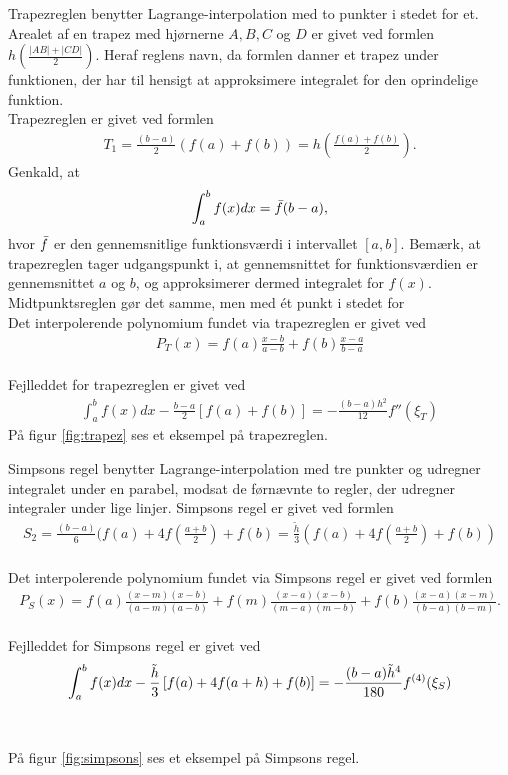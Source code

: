 Trapezreglen benytter Lagrange-interpolation med to punkter i stedet for et. 
Arealet af en trapez med hjørnerne $A, B, C$ og $D$ er givet ved formlen $h(\frac{|AB| + |CD|}{2})$. 
Heraf reglens navn, da formlen danner et trapez under funktionen, der har til hensigt at approksimere integralet for den oprindelige funktion. \\
Trapezreglen er givet ved formlen 
\begin{align*}
T_1 = \frac{(b-a)}{2}(f(a)+f(b))=h (\frac{f(a)+f(b)}{2}).
\end{align*}
Genkald, at 
\begin{align}
    \int_{a}^{b} f(x) dx = \Bar{f}(b-a),
\end{align}
hvor $\Bar{f}$ er den gennemsnitlige funktionsværdi i intervallet $[a,b]$.
Bemærk, at trapezreglen tager udgangspunkt i, at gennemsnittet for funktionsværdien er gennemsnittet $a$ og $b$, og approksimerer dermed integralet for $f(x)$. 
Midtpunktsreglen gør det samme, men med ét punkt i stedet for 
\\
Det interpolerende polynomium fundet via trapezreglen er givet ved
\begin{align*}
P_{T}(x)=f(a)\frac{x-b}{a-b}+f(b)\frac{x-a}{b-a}       
\end{align*}
\\
Fejlleddet for trapezreglen er givet ved 
\begin{align*}
\int_{a}^{b}f(x)dx-\frac{b-a}{2}\left [ f(a)+f(b) \right ]=-\frac{(b-a)h^2}{12}{f}''(\xi_T)
\end{align*}
På figur \ref{fig:trapez} ses et eksempel på trapezreglen. 


Simpsons regel benytter Lagrange-interpolation med tre punkter og udregner integralet under en parabel, modsat de førnævnte to regler, der udregner integraler under lige linjer. 
Simpsons regel er givet ved formlen 
\begin{align*}
S_2 = \frac{(b-a)}{6}(f(a)+4f(\frac{a+b}{2})+f(b)=\frac{\widetilde{h}}{3}(f(a)+4f(\frac{a+b}{2})+f(b))
\end{align*}
\\
Det interpolerende polynomium fundet via Simpsons regel er givet ved formlen
\begin{align*}
P_{S}(x)=f(a)\frac{(x-m)(x-b)}{(a-m)(a-b)}+f(m)\frac{(x-a)(x-b)}{(m-a)(m-b)}+f(b)\frac{(x-a)(x-m)}{(b-a)(b-m)}.
\end{align*}
\\
Fejlleddet for Simpsons regel er givet ved 
\begin{align*}
\int_{a}^{b}f(x)dx-\frac{\Tilde{h}}{3}\left [ f(a)+4f(a+h) + f(b) \right ]=-\frac{(b-a)\Tilde{h}^4}{180}{f}^{(4)}(\xi_S)
\end{align*} \\\\
På figur \ref{fig:simpsons} ses et eksempel på Simpsons regel. 



